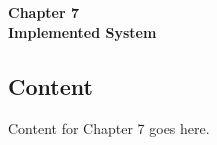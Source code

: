 
\titleformat{\chapter}[block]{\normalfont}{}{0pt}{}
\titlespacing{\chapter}{0pt}{-2em}{0pt}
\chapter[Implemented System]{}
\vspace*{\fill}
\begin{center}
\textbf{\Huge{Chapter 7}}\\
\vspace{5mm}
\textbf{\Huge{Implemented System}}
\end{center}
\vspace*{\fill}
\newpage

\titleformat{\chapter}[display]{\vspace{1cm}\normalfont\Large\bfseries\centering}{\chaptertitlename\ \thechapter}{20pt}{\vspace{0pt}}
\titlespacing*{\chapter}{0pt}{-50pt}{20pt}

\section{Content}
\justify

Content for Chapter 7 goes here.

